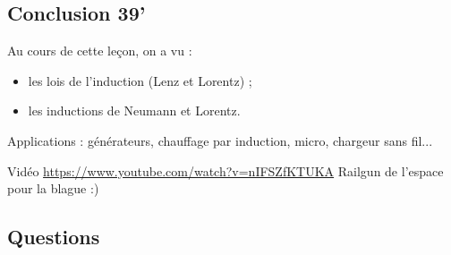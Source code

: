 \subsection{Conclusion 39'}

Au cours de cette leçon, on a vu :
\begin{itemize}
\item les lois de l'induction (Lenz et Lorentz) ;
\item les inductions de Neumann et Lorentz.
\end{itemize}

\begin{slide}
Applications : générateurs, chauffage par induction, micro, chargeur sans fil...
\end{slide}

\begin{slide}
Vidéo \url{https://www.youtube.com/watch?v=nIFSZfKTUKA} Railgun de l'espace pour la blague :)	
\end{slide}


\subsection{Questions}

